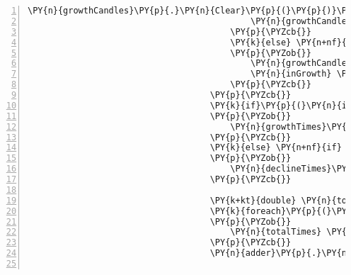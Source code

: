 \begin{Verbatim}[commandchars=\\\{\},numbers=left,firstnumber=1,stepnumber=1,numberblanklines=0]
                                            \PY{n}{growthCandles}\PY{p}{.}\PY{n}{Clear}\PY{p}{(}\PY{p}{)}\PY{p}{;}
                                            \PY{n}{growthCandles}\PY{p}{.}\PY{n}{Add}\PY{p}{(}\PY{n}{c}\PY{p}{)}\PY{p}{;}
                                        \PY{p}{\PYZcb{}}
                                        \PY{k}{else} \PY{n+nf}{if}\PY{p}{(}\PY{p}{(}\PY{n}{c}\PY{p}{.}\PY{n}{Close} \PY{p}{\PYZlt{}} \PY{n}{c}\PY{p}{.}\PY{n}{Open} \PY{p}{\PYZam{}}\PY{p}{\PYZam{}} \PY{n}{inGrowth} \PY{p}{=}\PY{p}{=} \PY{k}{false}\PY{p}{)} \PY{p}{|}\PY{p}{|} \PY{p}{(}\PY{n}{c}\PY{p}{.}\PY{n}{Close} \PY{p}{\PYZlt{}} \PY{n}{c}\PY{p}{.}\PY{n}{Open} \PY{p}{\PYZam{}}\PY{p}{\PYZam{}} \PY{n}{inGrowth} \PY{p}{=}\PY{p}{=} \PY{k}{null}\PY{p}{)}\PY{p}{)}
                                        \PY{p}{\PYZob{}}
                                            \PY{n}{growthCandles}\PY{p}{.}\PY{n}{Add}\PY{p}{(}\PY{n}{c}\PY{p}{)}\PY{p}{;}
                                            \PY{n}{inGrowth} \PY{p}{=} \PY{k}{false}\PY{p}{;}
                                        \PY{p}{\PYZcb{}}
                                    \PY{p}{\PYZcb{}}
                                    \PY{k}{if}\PY{p}{(}\PY{n}{inGrowth} \PY{p}{=}\PY{p}{=} \PY{k}{true}\PY{p}{)}
                                    \PY{p}{\PYZob{}}
                                        \PY{n}{growthTimes}\PY{p}{.}\PY{n}{Add}\PY{p}{(}\PY{n}{growthCandles}\PY{p}{.}\PY{n}{Last}\PY{p}{(}\PY{p}{)}\PY{p}{.}\PY{n}{Time}\PY{p}{.}\PY{n}{Subtract}\PY{p}{(}\PY{n}{growthCandles}\PY{p}{.}\PY{n}{First}\PY{p}{(}\PY{p}{)}\PY{p}{.}\PY{n}{Time}\PY{p}{)}\PY{p}{)}\PY{p}{;}
                                    \PY{p}{\PYZcb{}}
                                    \PY{k}{else} \PY{n+nf}{if} \PY{p}{(}\PY{n}{inGrowth} \PY{p}{=}\PY{p}{=} \PY{k}{false}\PY{p}{)}
                                    \PY{p}{\PYZob{}}
                                        \PY{n}{declineTimes}\PY{p}{.}\PY{n}{Add}\PY{p}{(}\PY{n}{growthCandles}\PY{p}{.}\PY{n}{Last}\PY{p}{(}\PY{p}{)}\PY{p}{.}\PY{n}{Time}\PY{p}{.}\PY{n}{Subtract}\PY{p}{(}\PY{n}{growthCandles}\PY{p}{.}\PY{n}{First}\PY{p}{(}\PY{p}{)}\PY{p}{.}\PY{n}{Time}\PY{p}{)}\PY{p}{)}\PY{p}{;}
                                    \PY{p}{\PYZcb{}}

                                    \PY{k+kt}{double} \PY{n}{totalTimes} \PY{p}{=} \PY{l+m}{0}\PY{p}{;}
                                    \PY{k}{foreach}\PY{p}{(}\PY{n}{TimeSpan} \PY{n}{time} \PY{k}{in} \PY{n}{growthTimes}\PY{p}{)}
                                    \PY{p}{\PYZob{}}
                                        \PY{n}{totalTimes} \PY{p}{+}\PY{p}{=} \PY{n}{t}\PY{p}{.}\PY{n}{TotalMilliseconds}\PY{p}{;}
                                    \PY{p}{\PYZcb{}}
                                    \PY{n}{adder}\PY{p}{.}\PY{n}{avgGrowthTime} \PY{p}{=} \PY{n}{TimeSpan}\PY{p}{.}\PY{n}{FromMilliseconds}\PY{p}{(}\PY{n}{totalTimes}\PY{p}{/} \PY{n}{growthTimes}\PY{p}{.}\PY{n}{Count}\PY{p}{(}\PY{p}{)}\PY{p}{)}\PY{p}{;}
                                    

\end{Verbatim}
